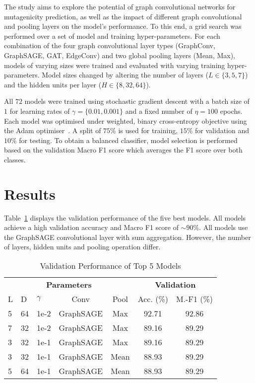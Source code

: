 \documentclass[10pt,conference,compsocconf]{IEEEtran}
\begin{document}
The study aims to explore the potential of graph convolutional networks for
mutagenicity prediction, as well as the impact of different graph convolutional
and pooling layers on the model's performance. To this end, a grid search was
performed over a set of model and training hyper-parameters. For each
combination of the four graph convolutional layer types (GraphConv, GraphSAGE,
GAT, EdgeConv) and two global pooling layers (Mean, Max), models of varying
sizes were trained and evaluated with varying training hyper-parameters. Model
sizes changed by altering the number of layers ($L \in \{3, 5, 7\}$) and the
hidden units per layer ($H \in \{8, 32, 64\}$). 

All $72$ models were trained using stochastic gradient descent with a batch size
of $1$ for learning rates of $\gamma=\{0.01, 0.001\}$ and a fixed number of
$\eta=100$ epochs. Each model was optimised under weighted, binary cross-entropy
objective using the Adam optimiser~\cite{adam}. A split of $75\%$ is used for
training, $15\%$ for validation and $10\%$ for testing. To obtain a balanced
classifier, model selection is performed based on the validation Macro F1 score
which averages the F1 score over both classes.

\section{Results}

Table~\ref{tab:top5} displays the validation performance of the five best
models. All models achieve a high validation accuracy and Macro F1 score of 
$\sim 90\%$. All models use the GraphSAGE convolutional layer with sum
aggregation. However, the number of layers, hidden units and pooling operation
differ. 

\begin{table}[ht]
  \centering
  \begin{tabular}{lllcccc}
    \toprule
    \multicolumn{5}{c}{\textbf{Parameters}} &
    \multicolumn{2}{c}{\textbf{Validation}} \\
    L & D & $\gamma$ & Conv & Pool & Acc. (\%) & M.-F1 (\%) \\
    \midrule
    5 & 64 & 1e-2 & GraphSAGE & Max & 92.71 & 92.86 \\
    7 & 32 & 1e-2 & GraphSAGE & Max & 89.16 & 89.29 \\
    3 & 32 & 1e-1 & GraphSAGE & Max & 89.16 & 89.29 \\
    3 & 32 & 1e-1 & GraphSAGE & Mean & 88.93 & 89.29 \\
    5 & 64 & 1e-1 & GraphSAGE & Mean & 88.93 & 89.29 \\
    \bottomrule
  \end{tabular}
  \caption{Validation Performance of Top 5 Models}
  \label{tab:top5}
\end{table}
\end{document}
